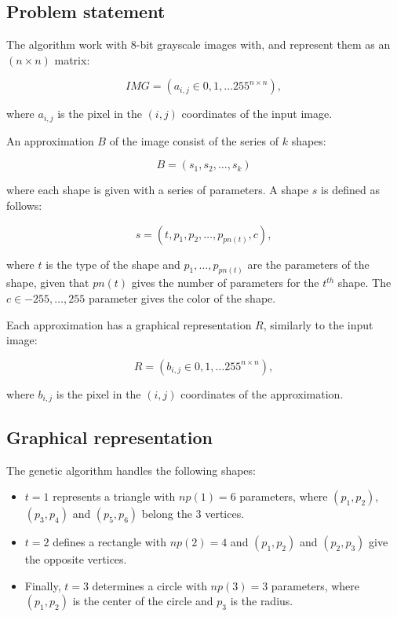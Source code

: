 \documentclass[conference]{IEEEtran}
\begin{document}
\subsection{Problem statement}

The algorithm work with 8-bit grayscale images with, and represent them as an $(n \times n)$
matrix:

\begin{equation}
  IMG=(a_{i,j} \in {0, 1, \dots 255}^{n \times n}),
\end{equation}

\noindent where $a_{i,j}$ is the pixel in the $(i, j)$ coordinates of the input image.

An approximation $B$ of the image consist of the series of $k$ shapes:

\begin{equation}
  B = (s_1, s_2, \dots, s_k)
\end{equation}

\noindent where each shape
is given with a series of parameters. A shape $s$ is defined as
follows:

\begin{equation}
  s = (t, p_1, p_2, \dots, p_{pn(t)}, c),
\end{equation}

\noindent where $t$ is the type of the shape and $p_1, \dots, p_{pn(t)}$ are
the parameters of the shape, given that $pn(t)$ gives  the number of parameters
for the $t^{th}$ shape. The $c \in {-255, \dots, 255}$ parameter gives
the color of the shape.

Each approximation has a graphical representation $R$, similarly to the
input image:

\begin{equation}
  R=(b_{i,j} \in {0, 1, \dots 255}^{n \times n}),
\end{equation}

\noindent where $b_{i,j}$ is the pixel in the $(i, j)$ coordinates of the approximation.

\subsection{Graphical representation}

The genetic algorithm handles the following shapes:

\begin{itemize}

  \item{$t=1$ represents a triangle with $np(1)=6$ parameters, where $(p_1, p_2)$,
    $(p_3, p_4)$ and $(p_5, p_6)$ belong the 3 vertices.}

  \item{$t=2$ defines a rectangle with $np(2)=4$ and $(p_1, p_2)$ and $(p_2, p_3)$}
    give the opposite vertices.

  \item{Finally, $t=3$ determines a circle with $np(3)=3$ parameters, where
    $(p_1, p_2)$ is the center of the circle and $p_3$ is the radius.}

\end{itemize}
\end{document}

